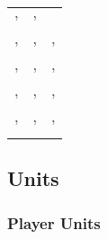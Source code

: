 \documentclass[]{article}
\theoremstyle{plain}
\theoremstyle{remark}
\theoremstyle{definition}
\begin{document}
\begin{longtable}[]{@{}lll@{}}
\begin{minipage}[t]{0.28\columnwidth}
'\strut
\end{minipage} & \begin{minipage}[t]{0.11\columnwidth}\raggedright
'\strut
\end{minipage}\tabularnewline
\begin{minipage}[t]{0.41\columnwidth}\raggedright
'\strut
\end{minipage} & \begin{minipage}[t]{0.28\columnwidth}\raggedright
'\strut
\end{minipage} & \begin{minipage}[t]{0.11\columnwidth}\raggedright
'\strut
\end{minipage}\tabularnewline
\begin{minipage}[t]{0.41\columnwidth}\raggedright
'\strut
\end{minipage} & \begin{minipage}[t]{0.28\columnwidth}\raggedright
'\strut
\end{minipage} & \begin{minipage}[t]{0.11\columnwidth}\raggedright
'\strut
\end{minipage}\tabularnewline
\begin{minipage}[t]{0.41\columnwidth}\raggedright
'\strut
\end{minipage} & \begin{minipage}[t]{0.28\columnwidth}\raggedright
'\strut
\end{minipage} & \begin{minipage}[t]{0.11\columnwidth}\raggedright
'\strut
\end{minipage}\tabularnewline
\begin{minipage}[t]{0.41\columnwidth}\raggedright
'\strut
\end{minipage} & \begin{minipage}[t]{0.28\columnwidth}\raggedright
'\strut
\end{minipage} & \begin{minipage}[t]{0.11\columnwidth}\raggedright
'\strut
\end{minipage}\tabularnewline
\bottomrule
\end{longtable}

\hypertarget{units}{%
\subsection{Units}\label{units}}

\hypertarget{player-units}{%
\subsubsection{Player Units}\label{player-units}}
\end{document}
